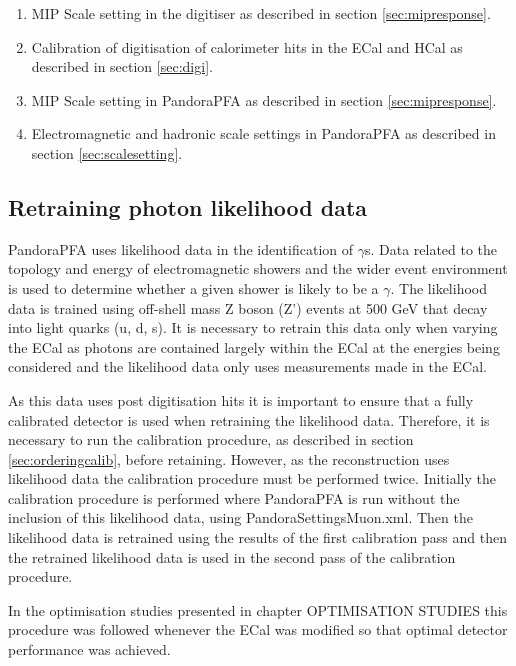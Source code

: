 \begin{enumerate}
\item MIP Scale setting in the digitiser as described in section \ref{sec:mipresponse}.
\item Calibration of digitisation of calorimeter hits in the ECal and HCal as described in section \ref{sec:digi}.
\item MIP Scale setting in PandoraPFA as described in section \ref{sec:mipresponse}.
\item Electromagnetic and hadronic scale settings in PandoraPFA as described in section \ref{sec:scalesetting}.
\end{enumerate}


\subsection{Retraining photon likelihood data}
PandoraPFA uses likelihood data in the identification of $\gamma$s.  Data related to the topology and energy of electromagnetic showers and the wider event environment is used to determine whether a given shower is likely to be a $\gamma$.  The likelihood data is trained using off-shell mass Z boson (Z') events at 500 GeV that decay into light quarks (u, d, s).  It is necessary to retrain this data only when varying the ECal as photons are contained largely within the ECal at the energies being considered and the likelihood data only uses measurements made in the ECal.

As this data uses post digitisation hits it is important to ensure that a fully calibrated detector is used when retraining the likelihood data.  Therefore, it is necessary to run the calibration procedure, as described in section \ref{sec:orderingcalib}, before retaining.  However, as the reconstruction uses likelihood data the calibration procedure must be performed twice.  Initially the calibration procedure is performed where PandoraPFA is run without the inclusion of this likelihood data, using PandoraSettingsMuon.xml.  Then the likelihood data is retrained using the results of the first calibration pass and then the retrained likelihood data is used in the second pass of the calibration procedure.  

In the optimisation studies presented in chapter OPTIMISATION STUDIES this procedure was followed whenever the ECal was modified so that optimal detector performance was achieved.  

